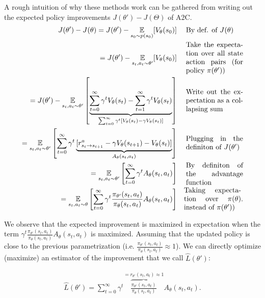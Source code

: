 A rough intuition of why these methods work can be gathered from writing out the expected policy improvements $J(\theta') - J(\Theta)$ of A2C. 
{\tiny
\begin{align*}
    J(\theta') - J(\theta) = J(\theta') - \underset{s_0 \sim p(s_0)}{\mathbb{E}} [V_\theta(s_0)] 
    && \parbox{8em}{By def. of $J(\theta)$} \\
    = J(\theta') - \underset{s_t,a_t \sim \theta'}{\mathbb{E}} [V_\theta(s_0)] 
    && \parbox{8em}{Take the expectation over all state action pairs (for policy $\pi(\theta')$)} \\
    = J(\theta')  
    - \underset{s_t,a_t \sim \theta'}{\mathbb{E}} \left[ \underbrace{\sum_{t=0}^\infty \gamma^t V_\theta(s_t) - \sum_{t=1}^\infty \gamma^t V_\theta(s_t)}_{\sum_{t=0}^\infty \gamma^t [V_\theta(s_t) - \gamma V_\theta(s_t) ]}\right]
    && \parbox{8em}{Write out the expectation as a collapsing sum}\\
    =  \underset{s_t,a_t \sim \theta'}{\mathbb{E}} \left[ \sum_{t=0}^\infty \gamma^t \underbrace{[r^{a}_{s_t \rightarrow s_{t+1}} - \gamma V_\theta(s_{t+1}) - V_\theta(s_{t}) ]}_{A_\theta(s_t,a_t)}  \right]
    && \parbox{8em}{Plugging in the definiton of $J(\theta')$}\\
    =  \underset{s_t,a_t \sim \theta'}{\mathbb{E}} \left[ \sum_{t=0}^\infty \gamma^t A_\theta(s_t,a_t)  \right] && \parbox{8em}{By definiton of the advantage function}\\
    = \underset{s_t,a_t \sim \theta}{\mathbb{E}} \left[ \sum_{t=0}^\infty \gamma^t \frac{\pi_{\theta'}(s_t,a_t)}{\pi_{\theta}(s_t,a_t)} A_\theta(s_t,a_t)  \right]
    && \parbox{8em}{Taking expectation over $\pi(\theta)$ instead of $\pi(\theta')$)}.\\
\end{align*}}


We observe that the expected improvement is maximized in expectation when the  term $\gamma^t \frac{\pi_{\theta'}(s_t,a_t)}{\pi_{\theta}(s_t,a_t)} A_\theta(s_t,a_t)$ is maximized. Assuming that the updated policy is close to the previous parametrization (i.e. $\frac{\pi_{\theta'}(s_t,a_t)}{\pi_{\theta}(s_t,a_t)} \approx 1$). We can directly optimize (maximize) an estimator of the improvement that we call $\hat{L}(\theta')$:

\begin{align*}
    \hat{L}(\theta') = \sum^\infty_{t=0} \gamma^t \overbrace{ \frac{\pi_{\theta'}(s_t,a_t)}{\pi_{\theta}(s_t,a_t)}}^{=r_{\theta'}(s_t,a_t) \approx 1} A_\theta(s_t,a_t).
\end{align*}


